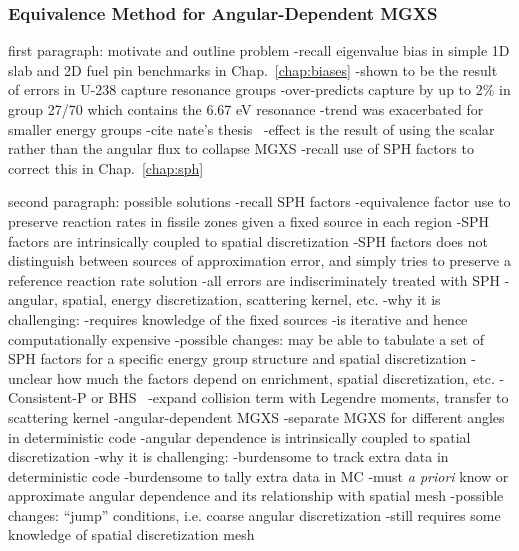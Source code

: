 \subsubsection{Equivalence Method for Angular-Dependent MGXS}
\label{subsubsec:chap12-angular-dependent-mgxs}

first paragraph: motivate and outline problem
-recall eigenvalue bias in simple 1D slab and 2D fuel pin benchmarks in Chap.~\ref{chap:biases}
-shown to be the result of errors in U-238 capture resonance groups
  -over-predicts capture by up to 2\% in group 27/70 which contains the 6.67 eV resonance 
  -trend was exacerbated for smaller energy groups
-cite nate's thesis~\cite{gibson2016thesis}
  -effect is the result of using the scalar rather than the angular flux to collapse \ac{MGXS}
-recall use of \ac{SPH} factors to correct this in Chap.~\ref{chap:sph}

second paragraph: possible solutions
-recall \ac{SPH} factors
  -equivalence factor use to preserve reaction rates in fissile zones given a fixed source in each region
  -\ac{SPH} factors are intrinsically coupled to spatial discretization
  -\ac{SPH} factors does not distinguish between sources of approximation error, and simply tries to preserve a reference reaction rate solution
    -all errors are indiscriminately treated with \ac{SPH}
      -angular, spatial, energy discretization, scattering kernel, etc. 
  -why it is challenging: 
    -requires knowledge of the fixed sources
    -is iterative and hence computationally expensive
  -possible changes: may be able to tabulate a set of \ac{SPH} factors for a specific energy group structure and spatial discretization
  -unclear how much the factors depend on enrichment, spatial discretization, etc.
-Consistent-P or BHS~\cite{bell1967transport}
  -expand collision term with Legendre moments, transfer to scattering kernel
-angular-dependent \ac{MGXS}
  -separate \ac{MGXS} for different angles in deterministic code
  -angular dependence is intrinsically coupled to spatial discretization
  -why it is challenging:
    -burdensome to track extra data in deterministic code
    -burdensome to tally extra data in \ac{MC}
    -must \textit{a priori} know or approximate angular dependence and its relationship with spatial mesh
  -possible changes: ``jump'' conditions, i.e. coarse angular discretization
    -still requires some knowledge of spatial discretization mesh

